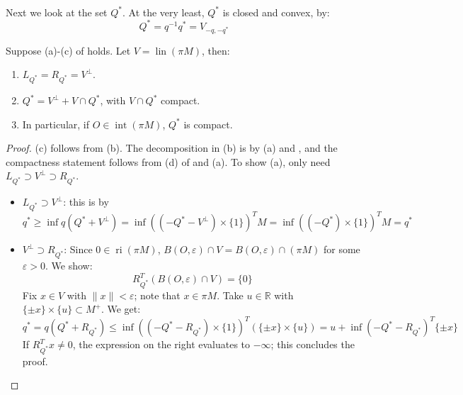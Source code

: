 \paragraph{}Next we look at the set $Q^\ast$. At the very least, $Q^\ast$ is closed and convex, by:
\[
	Q^\ast = q^{-1}q^\ast = V_{-q,-q^\ast}
\]

\begin{prop}\label{prop:032-optimal-set}
	Suppose (a)-(c) of  holds. Let $V=\operatorname{lin}(\pi M)$, then:
	\begin{enumerate}[label=(\alph*)]
		\item $L_{Q^\ast}=R_{Q^\ast}=V^\perp$.
		\item $Q^\ast = V^\perp + V\cap Q^\ast$, with $V\cap Q^\ast$ compact.
		\item In particular, if $O\in \operatorname{int}(\pi M)$, $Q^\ast$ is compact.
	\end{enumerate}
\end{prop}

\begin{proof}
	(c) follows from (b). The decomposition in (b) is by (a) and , and the compactness statement follows from (d) of  and (a). To show (a), only need $L_{Q^\ast}\supset V^\perp \supset R_{Q^\ast}$.
	\begin{itemize}
		\item $L_{Q^\ast}\supset V^\perp$: this is by
		      \[
			      q^\ast \geq \inf q(Q^\ast + V^\perp )=\inf \left((-Q^\ast - V^\perp)\times \{1\}\right)^T M = \inf \left((-Q^\ast) \times \{1\}\right)^TM = q^\ast
		      \]
		\item $V^\perp\supset R_{Q^\ast}$: Since $0\in \operatorname{ri}(\pi M)$, $B({O,\varepsilon})\cap V = B({O,\varepsilon})\cap (\pi M)$ for some $\varepsilon >0$. We show:
		      \[
			      R_{Q^\ast}^T \left(B({O,\varepsilon})\cap V\right) = \{0\}
		      \]
		      Fix $x\in V$ with $\|x\|<\varepsilon $; note that $x\in \pi M$. Take $u\in \mathbb{R}$ with $\{\pm x\}\times \{u\}\subset M^+$. We get:
		      \[
			      q^\ast = q(Q^\ast + R_{Q^\ast})\leq \inf \left(\left(-Q^\ast-R_{Q^\ast}\right)\times \{1\}\right)^T\left(\{\pm x\}\times \{u\}\right)
			      =u+\inf \left(-Q^\ast-R_{Q^\ast}\right)^T\{\pm x\}
		      \]
		      If $R_{Q^\ast}^Tx\neq0$, the expression on the right evaluates to $-\infty$; this concludes the proof. \qedhere
	\end{itemize}
\end{proof}

